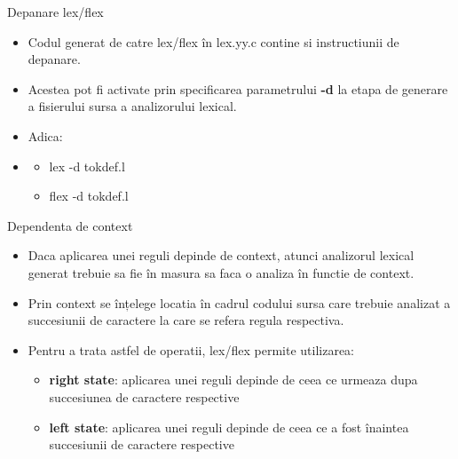 \documentclass[pdf]{beamer}
\begin{document}
\begin{frame}{Depanare lex/flex}
\begin{itemize}
\item
Codul generat de catre lex/flex în lex.yy.c contine si instructiunii de depanare.

\item
Acestea pot fi activate prin specificarea parametrului \textbf{-d} la etapa de generare a fisierului sursa a analizorului lexical.
\newline

\item
Adica:
\item
\begin{itemize}
    \item[]
    lex -d tokdef.l
    \item[]
    flex -d tokdef.l
\end{itemize}

\end{itemize}
\end{frame}



\begin{frame}{Dependenta de context}
\begin{itemize}
\item
Daca aplicarea unei reguli depinde de context, atunci analizorul lexical generat trebuie sa fie în masura sa faca o analiza în functie de context.
\newline

\item 
Prin context se înțelege locatia în cadrul codului sursa care trebuie analizat a succesiunii de caractere la care se refera regula respectiva.
\newline

\item
Pentru a trata astfel de operatii, lex/flex permite utilizarea:
\begin{itemize}
\item
\textbf{right state}: aplicarea unei reguli depinde de ceea ce urmeaza dupa succesiunea de caractere respective

\item
\textbf{left state}: aplicarea unei reguli depinde de ceea ce a fost înaintea succesiunii de caractere respective
\end{itemize}
\end{itemize}
\end{frame}
\end{document}
